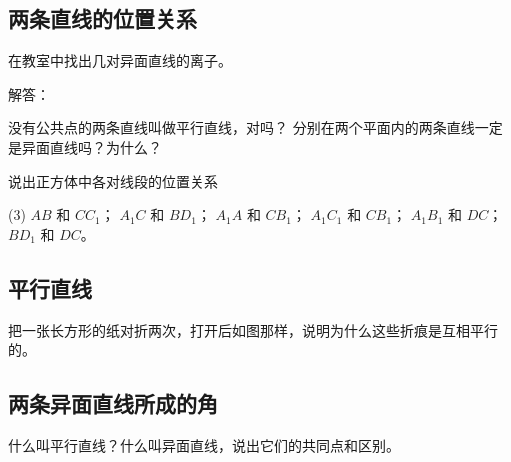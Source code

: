 \subsection{两条直线的位置关系}
\begin{Practice}
  \begin{question}
    \item 在教室中找出几对异面直线的离子。
    \item 解答：
    \begin{tasks}
      \task 没有公共点的两条直线叫做平行直线，对吗？
      \task 分别在两个平面内的两条直线一定是异面直线吗？为什么？
    \end{tasks}
    \item 说出正方体中各对线段的位置关系
    \begin{tasks}(3)
      \task $AB$ 和 $CC_1$；
      \task $A_1C$ 和 $BD_1$；
      \task $A_1A$ 和 $CB_1$；
      \task $A_1C_1$ 和 $CB_1$；
      \task $A_1B_1$ 和 $DC$；
      \task $BD_1$ 和 $DC$。
    \end{tasks}
  \end{question}
\end{Practice}
\subsection{平行直线}
\begin{Practice}
  \begin{question}
    \item 把一张长方形的纸对折两次，打开后如图那样，说明为什么这些折痕是互相平行的。
  \end{question}
\end{Practice}
\subsection{两条异面直线所成的角}
\begin{Practice}
  \begin{question}
    \item 
    \item 
    \item 
  \end{question}
\end{Practice}
\begin{Exercise}
  \begin{question}
    \item 什么叫平行直线？什么叫异面直线，说出它们的共同点和区别。
    \item 
    \item 
    \item 
    \item 
    \item 
    \item 
    \item 
    \item 
    \item 
    \item 
  \end{question}
\end{Exercise}

